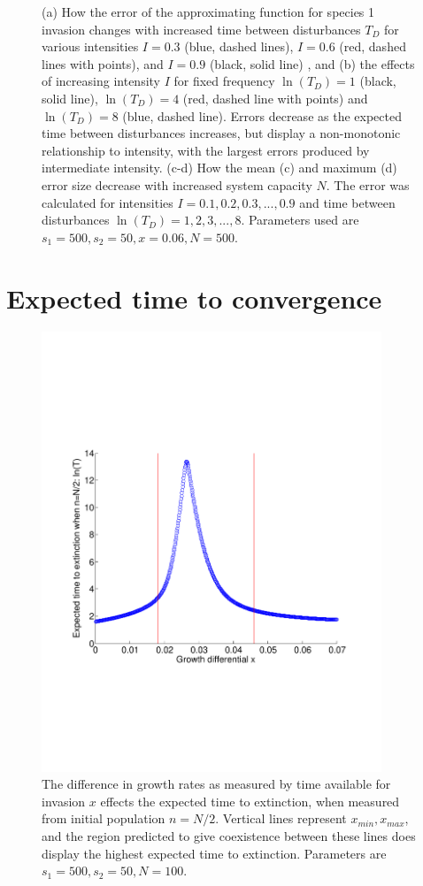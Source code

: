 \begin{figure}[th]
   \caption[Approximation errors for species 2 invasion]{(a) How the error of the approximating function for species 1 invasion changes with increased time between disturbances $T_D$ for various intensities $I=0.3$ (blue, dashed lines), $I=0.6$ (red, dashed lines with points), and $I=0.9$ (black, solid line) , and (b) the effects of increasing intensity $I$ for fixed frequency $\ln(T_D)=1$ (black, solid line), $\ln(T_D)=4$ (red, dashed line with points) and $\ln(T_D)=8$ (blue, dashed line). Errors decrease as the expected time between disturbances increases, but display a non-monotonic relationship to intensity, with the largest errors produced by intermediate intensity. (c-d) How the mean (c) and maximum (d) error size decrease with increased system capacity $N$. The error was calculated for intensities $I=0.1,0.2,0.3,...,0.9$ and time between disturbances $\ln(T_D)=1,2,3,...,8.$ Parameters used are $s_1=500,s_2=50,x=0.06,N=500$.}
 \label{fig:approxerrortot}
\end{figure}


 \section{Expected time to convergence}
 \label{app2b}
 \begin{figure}[th]
 \includegraphics[width=4in]{ttevx.pdf}
 \caption[How time to extinction varies with the difference in growth rates]{The difference in growth rates as measured by time available for invasion $x$ effects the expected time to extinction, when measured from initial population $n=N/2$. Vertical lines represent $x_{min},x_{max}$, and the region predicted to give coexistence between these lines does display the highest expected time to extinction. Parameters are $s_1=500,s_2=50,N=100$.}
 \label{fig:ttevx}
 \end{figure}
 
